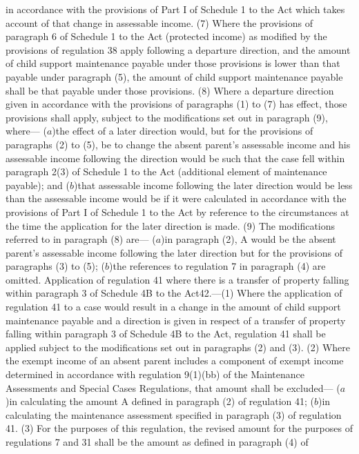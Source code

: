 \documentclass[a4paper]{article}
\begin{document}
in accordance with the provisions of Part I of Schedule 1 to the Act which takes
account of that change in assessable income.
(7) Where the provisions of paragraph 6 of Schedule 1 to the Act (protected
income) as modified by the provisions of regulation 38 apply following a
departure direction, and the amount of child support maintenance payable under
those provisions is lower than that payable under paragraph (5), the amount of
child support maintenance payable shall be that payable under those provisions.
(8) Where a departure direction given in accordance with the provisions of
paragraphs (1) to (7) has effect, those provisions shall apply, subject to the
modifications set out in paragraph (9), where—
($a$)the effect of a later direction would, but for the provisions of paragraphs
(2) to (5), be to change the absent parent’s assessable income and his
assessable income following the direction would be such that the case fell
within paragraph 2(3) of Schedule 1 to the Act (additional element of
maintenance payable); and
($b$)that assessable income following the later direction would be less than the
assessable income would be if it were calculated in accordance with the
provisions of Part I of Schedule 1 to the Act by reference to the circumstances
at the time the application for the later direction is made.
(9) The modifications referred to in paragraph (8) are—
($a$)in paragraph (2), A would be the absent parent’s assessable income following
the later direction but for the provisions of paragraphs (3) to (5);
($b$)the references to regulation 7 in paragraph (4) are omitted.
Application of regulation 41 where there is a transfer of property falling
within paragraph 3 of Schedule 4B to the Act42.—(1) Where the application of
regulation 41 to a case would result in a change in the amount of child support
maintenance payable and a direction is given in respect of a transfer of
property falling within paragraph 3 of Schedule 4B to the Act, regulation 41
shall be applied subject to the modifications set out in paragraphs (2) and (3).
(2) Where the exempt income of an absent parent includes a component of exempt
income determined in accordance with regulation 9(1)(bb) of the Maintenance
Assessments and Special Cases Regulations, that amount shall be excluded—
($a$)in calculating the amount A defined in paragraph (2) of regulation 41;
($b$)in calculating the maintenance assessment specified in paragraph (3) of
regulation 41.
(3) For the purposes of this regulation, the revised amount for the purposes of
regulations 7 and 31 shall be the amount as defined in paragraph (4) of
\end{document}
